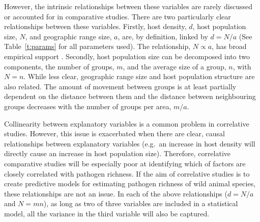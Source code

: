 
However, the intrinsic relationships between these variables are rarely discussed or accounted for in comparative studies.
There are two particularly clear relationships between these variables.
Firstly, host density, $d$, host population size, $N$, and geographic range size, $a$, are, by definition, linked by $d = N / a$ (See Table~\ref{t:params} for all parameters used).
The relationship, $N \propto a$, has broad empirical support \cite{blackburn2006variations, borregaard2010causality}.
Secondly, host population size can be decomposed into two components, the number of groups, $m$, and the average size of a group, $n$, with $N = n$.
While less clear, geographic range size and host population structure are also related.
The amount of movement between groups is at least partially dependent on the distance between them \cite{jenkins2010meta, le2012patterns, schooley2009enhancing} and the distance between neighbouring groups decreases with the number of groups per area, $m/a$.





Collinearity between explanatory variables is a common problem in correlative studies.
However, this issue is exacerbated when there are clear, causal relationships between explanatory variables (e.g.\ an increase in host density will directly cause an increase in host population size).
Therefore, correlative comparative studies will be especially poor at identifying which of factors are closely correlated with pathogen richness.
If the aim of correlative studies is to create predictive models for estimating pathogen richness of wild animal species, these relationships are not an issue.
In each of the above relationships ($d = N / a$ and $N = mn$), as long as two of three variables are included in a statistical model, all the variance in the third variable will also be captured.

